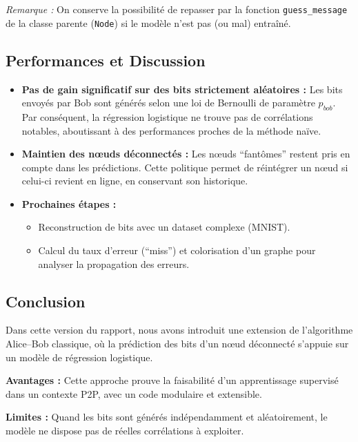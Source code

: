 \documentclass[a4paper,12pt]{article}
\begin{document}
\textit{Remarque :} On conserve la possibilité de repasser par la fonction \texttt{guess\_message} de la classe parente (\texttt{Node}) si le modèle n’est pas (ou mal) entraîné.

\subsection{Performances et Discussion}

\begin{itemize}
    \item \textbf{Pas de gain significatif sur des bits strictement aléatoires :}  
    Les bits envoyés par Bob sont générés selon une loi de Bernoulli de paramètre $p_{bob}$. Par conséquent, la régression logistique ne trouve pas de corrélations notables, aboutissant à des performances proches de la méthode naïve.

    \item \textbf{Maintien des nœuds déconnectés :}  
    Les nœuds “fantômes” restent pris en compte dans les prédictions. Cette politique permet de réintégrer un nœud si celui-ci revient en ligne, en conservant son historique.

    \item \textbf{Prochaines étapes :}
    \begin{itemize}
        \item Reconstruction de bits avec un dataset complexe (MNIST).
        \item Calcul du taux d'erreur (“miss”) et colorisation d’un graphe pour analyser la propagation des erreurs.
    \end{itemize}
\end{itemize}

\subsection{Conclusion}

Dans cette version du rapport, nous avons introduit une extension de l’algorithme Alice--Bob classique, où la prédiction des bits d’un nœud déconnecté s’appuie sur un modèle de régression logistique.  

\textbf{Avantages :}  
Cette approche prouve la faisabilité d’un apprentissage supervisé dans un contexte P2P, avec un code modulaire et extensible.  

\textbf{Limites :}  
Quand les bits sont générés indépendamment et aléatoirement, le modèle ne dispose pas de réelles corrélations à exploiter.  
\end{document}
